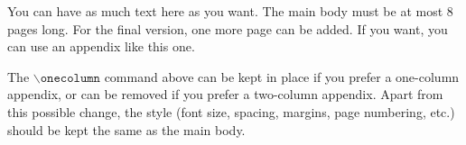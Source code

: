 \documentclass{article}
\theoremstyle{plain}
\theoremstyle{definition}
\theoremstyle{remark}
\begin{document}
You can have as much text here as you want. The main body must be at most $8$ pages long.
For the final version, one more page can be added.
If you want, you can use an appendix like this one.  

The $\mathtt{\backslash onecolumn}$ command above can be kept in place if you prefer a one-column appendix, or can be removed if you prefer a two-column appendix.  Apart from this possible change, the style (font size, spacing, margins, page numbering, etc.) should be kept the same as the main body.
\end{document}
